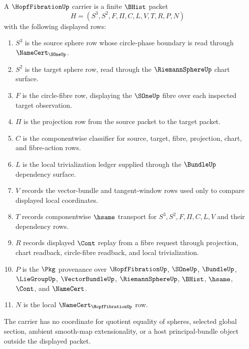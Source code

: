 \begin{definition}
\label{def:hopf-fibration-carrier}
A $\HopfFibrationUp$ carrier is a finite $\BHist$ packet
$$
H=(S^{3},S^{2},F,\Pi,C,L,V,T,R,P,N)
$$
with the following displayed rows:
\begin{enumerate}
\item $S^{3}$ is the source sphere row whose circle-phase boundary is read through $\NameCert_{\SOneUp}$.
\item $S^{2}$ is the target sphere row, read through the $\RiemannSphereUp$ chart surface.
\item $F$ is the circle-fibre row, displaying the $\SOneUp$ fibre over each inspected target observation.
\item $\Pi$ is the projection row from the source packet to the target packet.
\item $C$ is the componentwise classifier for source, target, fibre, projection, chart, and fibre-action rows.
\item $L$ is the local trivialization ledger supplied through the $\BundleUp$ dependency surface.
\item $V$ records the vector-bundle and tangent-window rows used only to compare displayed local coordinates.
\item $T$ records componentwise $\hsame$ transport for $S^{3},S^{2},F,\Pi,C,L,V$ and their dependency rows.
\item $R$ records displayed $\Cont$ replay from a fibre request through projection, chart readback, circle-fibre readback, and local trivialization.
\item $P$ is the $\Pkg$ provenance over $\HopfFibrationUp$, $\SOneUp$, $\BundleUp$, $\LieGroupUp$, $\VectorBundleUp$, $\RiemannSphereUp$, $\BHist$, $\hsame$, $\Cont$, and $\NameCert$.
\item $N$ is the local $\NameCert_{\HopfFibrationUp}$ row.
\end{enumerate}
The carrier has no coordinate for quotient equality of spheres, selected global section, ambient smooth-map extensionality, or a host principal-bundle object outside the displayed packet.
\end{definition}


